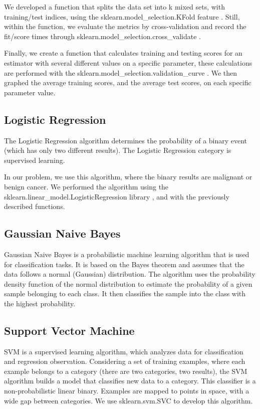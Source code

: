 \documentclass[conference]{IEEEtran}
\begin{document}
We developed a function that splits the data set into k mixed sets, with training/test indices, using the sklearn.model\_selection.KFold feature \cite{k-fold}. Still, within the function, we evaluate the metrics by cross-validation and record the fit/score times through sklearn.model\_selection.cross\_validate \cite{cross-validate}.

Finally, we create a function that calculates training and testing scores for an estimator with several different values on a specific parameter, these calculations are performed with the sklearn.model\_selection.validation\_curve \cite{validation-curve}. We then graphed the average training scores, and the average test scores, on each specific parameter value.

\subsection{Logistic Regression}
The Logistic Regression \cite{logistic-regression-def} algorithm determines the probability of a binary event (which has only two different results). The Logistic Regression category is supervised learning.

In our problem, we use this algorithm, where the binary results are malignant or benign cancer. We performed the algorithm using the sklearn.linear\_model.LogisticRegression library \cite{logistic-regression}, and with the previously described functions.

\subsection{Gaussian Naive Bayes}
Gaussian Naive Bayes \cite{gnb}is a probabilistic machine learning algorithm that is used for classification tasks. It is based on the Bayes theorem and assumes that the data follows a normal (Gaussian) distribution. The algorithm uses the probability density function of the normal distribution to estimate the probability of a given sample belonging to each class. It then classifies the sample into the class with the highest probability.

\subsection{Support Vector Machine}
SVM \cite{svm-def} is a supervised learning algorithm, which analyzes data for classification and regression observation. Considering a set of training examples, where each example belongs to a category (there are two categories, two results), the SVM algorithm builds a model that classifies new data to a category. This classifier is a non-probabilistic linear binary. Examples are mapped to points in space, with a wide gap between categories. We use sklearn.svm.SVC \cite{svm} to develop this algorithm.
\end{document}

